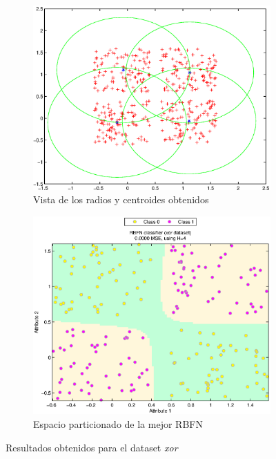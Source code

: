\documentclass[journal]{IEEEtran}
\begin{document}

\begin{figure}
\center
    \begin{subfigure}[b]{0.5\textwidth}            
            \includegraphics[width=\textwidth]{imagenes/xor-centroids}
            \caption{Vista de los radios y centroides obtenidos}
            \label{fig:xor-centroids}
    \end{subfigure}%
    \begin{subfigure}[b]{0.5\textwidth}
            \center
            \includegraphics[width=\textwidth]{imagenes/xor}
            \caption{Espacio particionado de la mejor RBFN}
            \label{fig:xor-partition}
    \end{subfigure}
    \caption{Resultados obtenidos para el dataset \emph{xor}}\label{fig:espacio-particionado-xor}
\end{figure}
\end{document}
